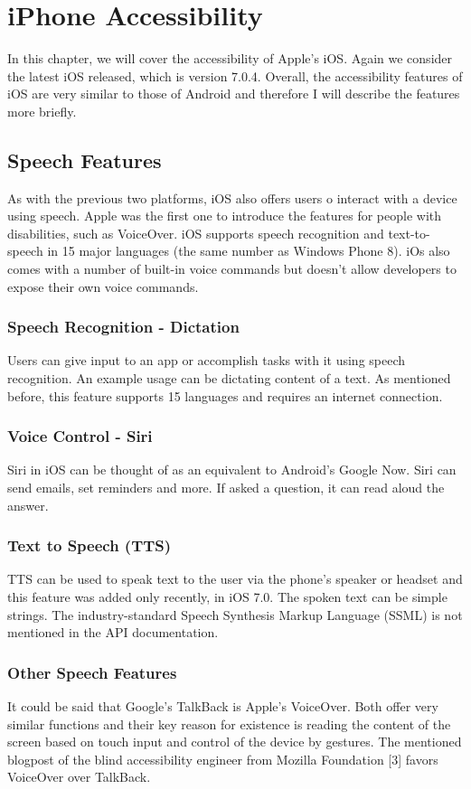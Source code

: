 \chapter{iPhone Accessibility}
In this chapter, we will cover the accessibility of Apple’s iOS. Again we consider the latest iOS released, which is version 7.0.4. Overall, the accessibility features of iOS are very similar to those of Android and therefore I will describe the features more briefly.
\section{Speech Features}
As with the previous two platforms, iOS also offers users o interact with a device using speech. Apple was the first one to introduce the features for people with disabilities, such as VoiceOver. iOS supports speech recognition and text-to-speech in 15 major languages (the same number as Windows Phone 8).
iOs also comes with a number of built-in voice commands but doesn’t allow developers to expose their own voice commands.
\subsection{Speech Recognition - Dictation}
Users can give input to an app or accomplish tasks with it using speech recognition. An example usage can be dictating content of a text. As mentioned before, this feature supports 15 languages and requires an internet connection.
\subsection{Voice Control - Siri}
Siri in iOS can be thought of as an equivalent to Android’s Google Now. Siri can send emails, set reminders and more. If asked a question, it can read aloud the answer. 
\subsection{Text to Speech (TTS)}
TTS can be used to speak text to the user via the phone’s speaker or headset and this feature was added only recently, in iOS 7.0. The spoken text can be simple strings. The industry-standard Speech Synthesis Markup Language (SSML) is not mentioned in the API documentation.
\subsection{Other Speech Features}
It could be said that Google’s TalkBack is Apple’s VoiceOver. Both offer very similar functions and their key reason for existence is reading the content of the screen based on touch input and control of the device by gestures.
The mentioned blogpost of the blind accessibility engineer from Mozilla Foundation [3] favors VoiceOver over TalkBack.

